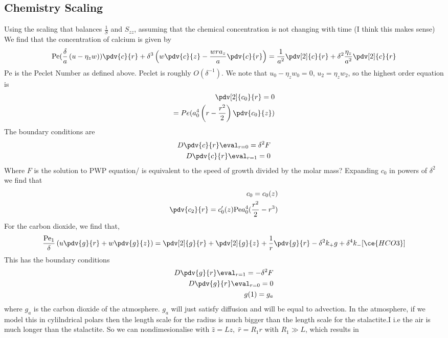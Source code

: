 \documentclass[12pt]{article}
\newcommand{\Pe}{\mathrm{Pe}}
\begin{document}
\subsection{Chemistry Scaling}
Using the scaling that balances $\frac{1}{S}$ and $S_{zz}$, assuming that the chemical concentration is not changing with time (I think this makes sense)
We find that the concentration of calcium is given by 
\begin{align}
\Pe (\frac{\delta}{a}\left(u-\eta_z w\right))\pdv{c}{r} + \delta^3\left(w\pdv{c}{z}-\frac{w r a_z}{a}\pdv{c}{r} \right) = \frac{1}{a^2}\pdv[2]{c}{r} + \delta^2\frac{\eta_z}{a^2}\pdv[2]{c}{r}
\end{align}
$\Pe$ is the Peclet Number as defined above. Peclet is roughly $O(\delta^{-1})$. We  note that $u_0 -\eta_z w_0 = 0$, $u_2 = \eta_z w_2$, so the highest order equation is 
\begin{align}
\pdv[2]{c_0}{r} = 0\\
 = Pe(a_0^4 \left(r - \frac{r^2}{2}\right) \pdv{c_0}{z})
\end{align}
The boundary conditions are 
\begin{align}
D\pdv{c}{r}\eval_{r=0} = \delta^2 F \\
D\pdv{c}{r}\eval_{r=1} = 0 
\end{align}
Where $F$ is the solution to PWP equation/ is equivalent to the speed of growth divided by the molar mass?
Expanding $c_0$ in powers of $\delta^2$ we find that 
\begin{align}
c_0 = c_0(z)\\
\pdv{c_2}{r} = c_0'(z)\Pe a_0^4(\frac{r^2}{2}-r^3) 
\end{align}
For the carbon dioxide, we find that,
\begin{align}
\frac{\Pe_1}{\delta}\left(u \pdv{g}{r} + w\pdv{g}{z} \right)  = \pdv[2]{g}{r} + \pdv[2]{g}{z}+\frac{1}{r}\pdv{g}{r} - \delta^2 k_+ g + \delta^4k_-[\ce{HCO3}] 
\end{align}
This has the boundary conditions
\begin{align}
D\pdv{g}{r}\eval_{r=1} = -\delta^2 F \\
D\pdv{g}{r}\eval_{r=0} = 0 \\
g(1) = g_a
\end{align}
where $g_a$ is the carbon dioxide of the atmosphere.
$g_a$ will just satisfy diffusion and will be equal to advection. In the atmosphere, if we model this in cylilndrical polars then the length scale for the radius is much bigger than the length scale for the stalactite.I i.e the air is much longer than the stalactite. So we can nondimesionalise with $\hat z = Lz,\; \hat r = R_1 r$ with $R_1\gg L$, which results in 
\end{document}
